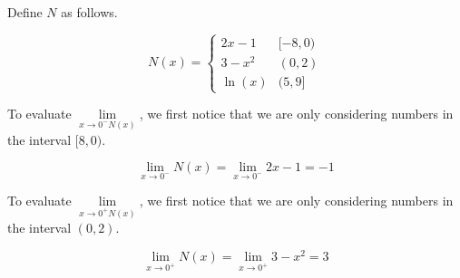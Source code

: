 \documentclass{ximera}
\begin{document}
\begin{example}

Define $N$ as follows.


\[
N(x) = 
\begin{cases}
  2x - 1   &    [-8, 0)     \\
  3 - x^2  &    (0, 2) \\
  \ln(x)    &    (5, 9]
\end{cases}
\]







\begin{explanation}


To evaluate $\lim\limits_{x \to 0^- N(x)}$, we first notice that we are only considering numbers in the interval $[8, 0)$.


\[
\lim\limits_{x \to 0^-} N(x) = \lim\limits_{x \to 0^-} 2x - 1 = -1
\]



\end{explanation}









\begin{explanation}


To evaluate $\lim\limits_{x \to 0^+ N(x)}$, we first notice that we are only considering numbers in the interval $(0,2)$.


\[
\lim\limits_{x \to 0^+} N(x) = \lim\limits_{x \to 0^+} 3 - x^2 = 3
\]



\end{explanation}





\end{example}
\end{document}
